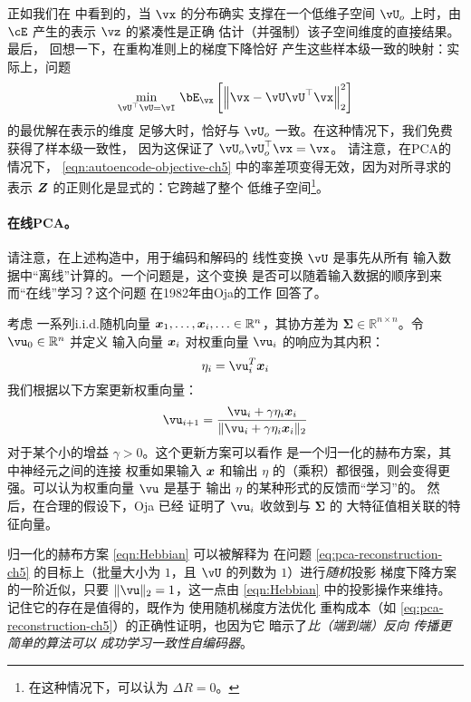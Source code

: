 \documentclass[../../book-main.tex]{subfiles}
\begin{document}
正如我们在  中看到的，当 $\vx$ 的分布确实
支撑在一个低维子空间 $\vU_o$ 上时，由 $\cE$ 产生的表示
$\vz$ 的紧凑性是正确
估计（并强制）该子空间维度的直接结果。最后，
回想一下，在重构准则上的梯度下降恰好
产生这些样本级一致的映射：实际上，问题
\begin{equation}\label{eq:pca-reconstruction-ch5}
  \min_{\vU^\top \vU = \vI}\, \bE_{\vx}\left[\norm*{\vx
  - \vU\vU^\top \vx}_2^2\right]
\end{equation}
的最优解在表示的维度
足够大时，恰好与 $\vU_o$ 一致。在这种情况下，我们免费获得了样本级一致性，
因为这保证了 $\vU_o\vU_o^\top \vx = \vx$。
请注意，在PCA的情况下，
\eqref{eqn:autoencode-objective-ch5} 中的率差项变得无效，因为对所寻求的表示 $\bm{Z}$ 的正则化是显式的：它跨越了整个
低维子空间\footnote{在这种情况下，可以认为 $\Delta R = 0$。}。

\paragraph{在线PCA。} 请注意，在上述构造中，用于编码和解码的
线性变换 $\vU$ 是事先从所有
输入数据中“离线”计算的。一个问题是，这个变换
是否可以随着输入数据的顺序到来而“在线”学习？这个问题
在1982年由Oja的工作 \cite{Oja1982SimplifiedNM} 回答了。
\begin{example}[PCA的归一化赫布学习方案] 考虑
  一系列i.i.d.随机向量 $\bm{x}_1, \ldots, \bm{x}_i, \ldots \in
  \mathbb{R}^n$，其协方差为 $\boldsymbol{\Sigma} \in
  \mathbb{R}^{n\times n}$。令 $\vu_0 \in \mathbb{R}^n$ 并定义
  输入向量 $\bm{x}_i$ 对权重向量
  $\vu_i$ 的响应为其内积：
  \begin{equation}
    \eta_i = \vu_i^T \x_i
  \end{equation}
  我们根据以下方案更新权重向量：
  \begin{equation}
    \vu_{i+1} = \frac{\vu_i + \gamma \eta_i \x_i}{\|\vu_i + \gamma
    \eta_i \x_i\|_2}
    \label{eqn:Hebbian}
  \end{equation}
  对于某个小的增益 $\gamma >0$。这个更新方案可以看作
  是一个归一化的赫布方案，其中神经元之间的连接
  权重如果输入 $\bm{x}$ 和输出 $\eta$ 的（乘积）都很强，则会变得更强。可以认为权重向量
  $\vu$ 是基于
  输出 $\eta$ 的某种形式的反馈而“学习”的。
  然后，在合理的假设下，Oja \cite{Oja1982SimplifiedNM} 已经
  证明了 $\vu_i$ 收敛到与 $\boldsymbol{\Sigma}$ 的
  大特征值相关联的特征向量。
\end{example}

归一化的赫布方案 \eqref{eqn:Hebbian} 可以被解释为
在问题 \eqref{eq:pca-reconstruction-ch5} 的目标上（批量大小为
$1$，且 $\vU$ 的列数为 $1$）进行\textit{随机}投影
梯度下降方案的一阶近似，只要
$\norm{\vu}_2 = 1$，这一点由
\eqref{eqn:Hebbian} 中的投影操作来维持。
记住它的存在是值得的，既作为
使用随机梯度方法优化
重构成本（如 \eqref{eq:pca-reconstruction-ch5}）的正确性证明，也因为它
暗示了\textit{比（端到端）反向
  传播更简单的算法可以
成功学习一致性自编码器}。
\end{document}
